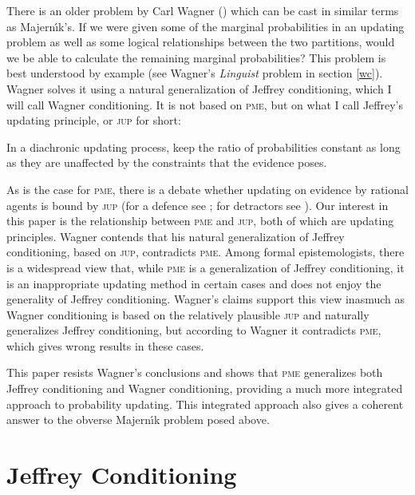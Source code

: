 There is an older problem by Carl Wagner ()
which can be cast in similar terms as Majern{\'\i}k's. If we were
given some of the marginal probabilities in an updating problem as
well as some logical relationships between the two partitions, would
we be able to calculate the remaining marginal probabilities? This
problem is best understood by example (see Wagner's \emph{Linguist}
problem in section \ref{wc}). Wagner solves it using a natural
generalization of Jeffrey conditioning, which I will call Wagner
conditioning. It is not based on \textsc{pme}, but on what I call
Jeffrey's updating principle, or \textsc{jup} for short:

\begin{quotex}
   In a diachronic updating process, keep the ratio of
  probabilities constant as long as they are unaffected by the
  constraints that the evidence poses.
\end{quotex}

As is the case for \textsc{pme}, there is a debate whether updating on
evidence by rational agents is bound by \textsc{jup} (for a defence
see ; for detractors see
). Our interest in this paper is the
relationship between \textsc{pme} and \textsc{jup}, both of which are
updating principles. Wagner contends that his natural generalization
of Jeffrey conditioning, based on \textsc{jup}, contradicts
\textsc{pme}. Among formal epistemologists, there is a widespread view
that, while \textsc{pme} is a generalization of Jeffrey conditioning,
it is an inappropriate updating method in certain cases and does not
enjoy the generality of Jeffrey conditioning. Wagner's claims support
this view inasmuch as Wagner conditioning is based on the relatively
plausible \textsc{jup} and naturally generalizes Jeffrey conditioning,
but according to Wagner it contradicts \textsc{pme}, which gives wrong
results in these cases.

This paper resists Wagner's conclusions and shows that \textsc{pme}
generalizes both Jeffrey conditioning and Wagner conditioning,
providing a much more integrated approach to probability updating.
This integrated approach also gives a coherent answer to the obverse
Majern{\'\i}k problem posed above.

\section{Jeffrey Conditioning}
\label{jc}

